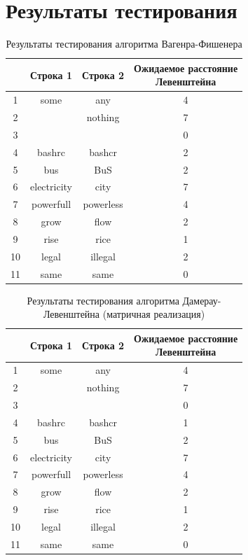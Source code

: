 \section{Результаты тестирования}

\begin{table}[H]
    \caption{Результаты тестирования алгоритма Вагенра-Фишенера}
	\begin{tabular}{|c|c|c|c|}
 	\hline
    \No{} & Строка 1 & Строка 2 & \makecell{Ожидаемое расстояние\\Левенштейна}\\
 	\hline
 	1 & some & any & 4\\
 	\hline
 	2 & & nothing & 7\\
 	\hline
 	3 & & & 0\\
 	\hline
 	4 & bashrc & bashcr & 2\\
 	\hline
 	5 & bus & BuS & 2\\
 	\hline
 	6 & electricity & city & 7\\
 	\hline
 	7 & powerfull & powerless & 4\\
 	\hline
 	8 & grow & flow & 2\\
 	\hline
 	9 & rise & rice & 1\\
 	\hline
    10 & legal & illegal & 2\\
 	\hline
    11 & same & same & 0\\
    \hline
	\end{tabular}
\end{table}

\begin{table}[H]
    \caption{Результаты тестирования алгоритма Дамерау-Левенштейна (матричная реализация)}
	\begin{tabular}{|c|c|c|c|}
 	\hline
    \No{} & Строка 1 & Строка 2 & \makecell{Ожидаемое расстояние\\Левенштейна}\\
 	\hline
 	1 & some & any & 4\\
 	\hline
 	2 & & nothing & 7\\
 	\hline
 	3 & & & 0\\
 	\hline
 	4 & bashrc & bashcr & 1\\
 	\hline
 	5 & bus & BuS & 2\\
 	\hline
 	6 & electricity & city & 7\\
 	\hline
 	7 & powerfull & powerless & 4\\
 	\hline
 	8 & grow & flow & 2\\
 	\hline
 	9 & rise & rice & 1\\
 	\hline
    10 & legal & illegal & 2\\
 	\hline
    11 & same & same & 0\\
    \hline
	\end{tabular}
\end{table}

